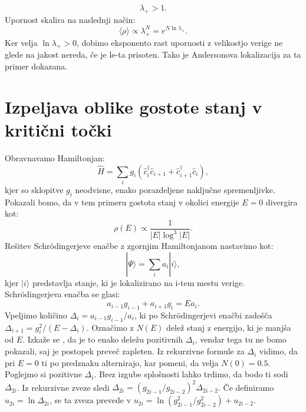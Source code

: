 \begin{appendices}
\begin{equation}
\lambda_+ > 1.
\end{equation}
Upornost skalira na naslednji način: 
\begin{equation}
\langle \rho \rangle \propto \lambda_+^N = e^{N \ln \lambda_+}.
\end{equation}
Ker velja $\ln \lambda_+ > 0$, dobimo eksponento rast upornosti z velikostjo verige ne glede na jakost nereda, če je le-ta prisoten. Tako je Andersonova lokalizacija za ta primer dokazana.

\chapter{Izpeljava oblike gostote stanj v kritični točki}

Obravnavamo Hamiltonjan:
\begin{equation}
\hat{H} = \sum_i g_i \left( \hat{c}_i^\dagger \hat{c}_{i+1} +  \hat{c}_{i+1}^\dagger \hat{c}_i\right),
\end{equation}
kjer so sklopitve $g_i$ neodvisne, enako porazdeljene naključne spremenljivke.
Pokazali bomo, da v tem primeru gostota stanj v okolici energije $E=0$ divergira kot:
\begin{equation}
\rho(E) \propto \frac{1}{|E| \log^3 |E|}.
\end{equation}
Rešitev Schrödingerjeve enačbe z zgornjim Hamiltonjanom nastavimo kot:
\begin{equation}
| \Psi \rangle = \sum_i a_i  | i \rangle,
\end{equation}
kjer $|i \rangle$ predstavlja stanje, ki je lokalizirano na i-tem mestu verige.
Schrödingerjeva enačba se glasi:
\begin{equation}
a_{i-1} g_{i-1} + a_{i+1} g_i = E a_i.
\end{equation}
Vpeljimo količino $\Delta_i = a_{i-1} g_{i-1} / a_i$, ki po Schrödingerjevi enačbi zadošča $\Delta_{i+1} = g_i^2 / (E- \Delta_i)$. Označimo z $N(E)$ delež stanj z energijo, ki je manjša od $E$. Izkaže se \cite{dokazgostota}, da je to enako deležu pozitivnih $\Delta_i$, vendar tega tu ne bomo pokazali, saj je postopek preveč zapleten. Iz rekurzivne formule za $\Delta_i$ vidimo, da pri $E=0$ ti po predznaku alternirajo, kar pomeni, da velja $N(0) = 0.5$.
Poglejmo si pozitivne $\Delta_i$. Brez izgube splošnosti lahko trdimo, da bodo ti sodi $\Delta_{2i}$.
Iz rekurzivne zveze sledi $\Delta_{2i} = (g_{2i-1}/g_{2i-2})^2 \Delta_{2i-2}$.
Če definiramo $u_{2i} = \ln \Delta_{2i}$, se ta zveza prevede v $u_{2i} = \ln (g^2_{2i-1}/g^2_{2i-2}) + u_{2i-2}$.

\end{appendices}
